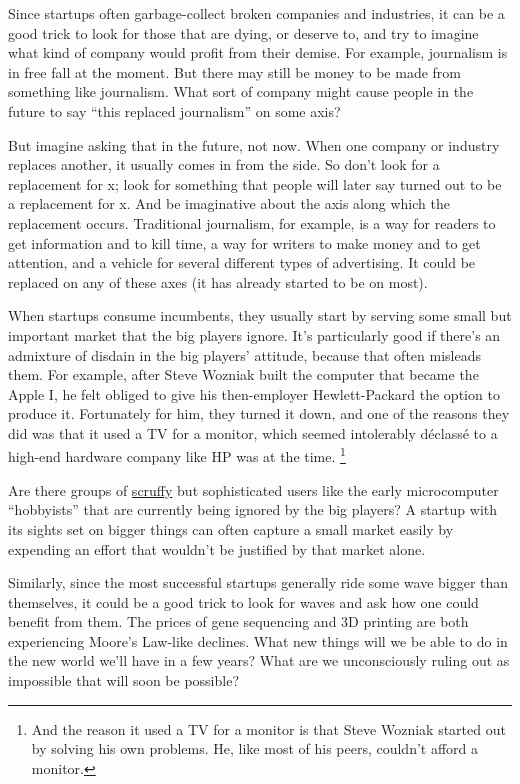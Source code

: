 Since startups often garbage-collect broken companies and industries, it
can be a good trick to look for those that are dying, or deserve to, and
try to imagine what kind of company would profit from their demise. For
example, journalism is in free fall at the moment. But there may still
be money to be made from something like journalism. What sort of company
might cause people in the future to say ``this replaced journalism'' on
some axis?

But imagine asking that in the future, not now. When one company or
industry replaces another, it usually comes in from the side. So don't
look for a replacement for x; look for something that people will later
say turned out to be a replacement for x. And be imaginative about the
axis along which the replacement occurs. Traditional journalism, for
example, is a way for readers to get information and to kill time, a way
for writers to make money and to get attention, and a vehicle for
several different types of advertising. It could be replaced on any of
these axes (it has already started to be on most).

When startups consume incumbents, they usually start by serving some
small but important market that the big players ignore. It's
particularly good if there's an admixture of disdain in the big players'
attitude, because that often misleads them. For example, after Steve
Wozniak built the computer that became the Apple I, he felt obliged to
give his then-employer Hewlett-Packard the option to produce it.
Fortunately for him, they turned it down, and one of the reasons they
did was that it used a TV for a monitor, which seemed intolerably
déclassé to a high-end hardware company like HP was at the time.
\footnote{And the reason it used a TV for a monitor is that Steve Wozniak
started out by solving his own problems. He, like most of his peers,
couldn't afford a monitor.}

Are there groups of \href{marginal.html}{scruffy} but sophisticated
users like the early microcomputer ``hobbyists'' that are currently
being ignored by the big players? A startup with its sights set on
bigger things can often capture a small market easily by expending an
effort that wouldn't be justified by that market alone.

Similarly, since the most successful startups generally ride some wave
bigger than themselves, it could be a good trick to look for waves and
ask how one could benefit from them. The prices of gene sequencing and
3D printing are both experiencing Moore's Law-like declines. What new
things will we be able to do in the new world we'll have in a few years?
What are we unconsciously ruling out as impossible that will soon be
possible?


